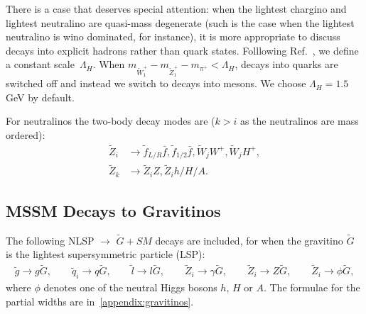 \documentclass[final,3p,times]{elsarticle}
\begin{document}
There is a case that deserves special attention: when the lightest
chargino and lightest neutralino are quasi-mass degenerate (such is the case
when the lightest neutralino is wino dominated, for instance), it is more
appropriate to discuss decays into explicit hadrons rather than quark states. 
Folllowing Ref.~\cite{gunionetal}, we define a constant
scale~$\Lambda_H$. When $m_{{\tilde W}_1^+} - m_{{\tilde 
    Z}_1^+} - m_{\pi^+} < \Lambda_H$, decays into quarks are switched off and 
instead we switch to decays into mesons. We choose $\Lambda_H=1.5$
GeV by default. 


For neutralinos the two-body decay modes are ($k>i$ as the neutralinos
are mass ordered): 
\begin{align*}
\tilde{Z}_{i} &\rightarrow \tilde{f}_{L/R} \bar{f}, \tilde{f}_{1/2} \bar{f}, \tilde{W}_{j} W^+, \tilde{W}_{j} H^+,\\
\tilde{Z}_{k} &\rightarrow \tilde{Z}_{i} Z, \tilde{Z}_i h/H/A.
\end{align*}

\subsection{MSSM Decays to Gravitinos}
The following NLSP $\rightarrow$ $\tilde{G} + SM$ decays are included,
for when the gravitino $\tilde{G}$ is the lightest supersymmetric particle
(LSP):
\begin{align*}
\tilde{g} \rightarrow g \tilde{G}, \qquad
\tilde{q}_{i} \rightarrow q \tilde{G}, \qquad
\tilde{l} \rightarrow l \tilde{G}, \qquad
\tilde{Z}_{i} \rightarrow \gamma \tilde{G}, \qquad
\tilde{Z}_{i} \rightarrow Z \tilde{G}, \qquad
\tilde{Z}_{i} \rightarrow \phi \tilde{G},
\end{align*}
where $\phi$ denotes one of the neutral Higgs bosons $h$, $H$ or $A$.
The formulae for the partial widths are in~\ref{appendix:gravitinos}.
\end{document}
